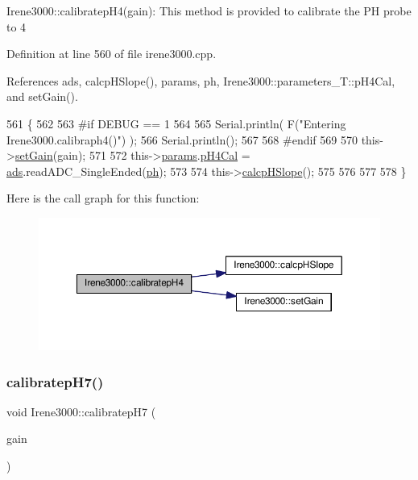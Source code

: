 Irene3000\+::calibratep\+H4(gain)\+: This method is provided to calibrate the PH probe to 4 

Definition at line 560 of file irene3000.\+cpp.



References ads, calcp\+H\+Slope(), params, ph, Irene3000\+::parameters\+\_\+\+T\+::p\+H4\+Cal, and set\+Gain().


\begin{DoxyCode}
561 \{
562 
563 \textcolor{preprocessor}{#if DEBUG == 1 }
564 
565     Serial.println( F(\textcolor{stringliteral}{"Entering Irene3000.calibraph4()"}) );
566     Serial.println();
567 
568 \textcolor{preprocessor}{#endif }
569     
570     this->\hyperlink{classIrene3000_aff7c5da186b388e7272e63ff88a20c34}{setGain}(gain);
571 
572     this->\hyperlink{classIrene3000_a136585a5ee7f9ac6ab52175fa153f8e3}{params}.\hyperlink{structIrene3000_1_1parameters__T_a1144de6fb54eb3e1dd2a3d8c2afc97dc}{pH4Cal} =  \hyperlink{classIrene3000_a1215e77ba761c9908d80d691f149e135}{ads}.readADC\_SingleEnded(\hyperlink{Irene3000_8h_af771ceafe0e6524dd8497d4305dfe778}{ph});
573 
574     this->\hyperlink{classIrene3000_a81f6a79e546679692053f7ac1af49613}{calcpHSlope}();
575 
576 
577 
578 \}
\end{DoxyCode}
Here is the call graph for this function\+:\nopagebreak
\begin{figure}[H]
\begin{center}
\leavevmode
\includegraphics[width=350pt]{classIrene3000_a9772eeea2305fad6236a82e33e93892e_cgraph}
\end{center}
\end{figure}
\mbox{\label{classIrene3000_a2e810ddfa8b95eaa2446a408761c6bdc}} 
\subsubsection{\texorpdfstring{calibratep\+H7()}{calibratepH7()}}
{\footnotesize\ttfamily void Irene3000\+::calibratep\+H7 (\begin{DoxyParamCaption}\item[{ads\+Gain\+\_\+t}]{gain }\end{DoxyParamCaption})}

